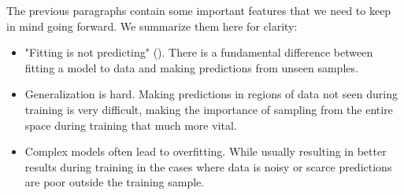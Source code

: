 The previous paragraphs contain some important features that we need to keep in mind going forward. We summarize them here for clarity: 
\begin{itemize}
\item "Fitting is not predicting" (\cite{Mehta2019}). There is a fundamental difference between fitting a model to data and making predictions from unseen samples. \\
\item Generalization is hard. Making predictions in regions of data not seen during training is very difficult, making the importance of sampling from the entire space during training that much more vital. \\
\item Complex models often lead to overfitting. While usually resulting in better results during training in the cases where data is noisy or scarce predictions are poor outside the training sample. 
\end{itemize}
